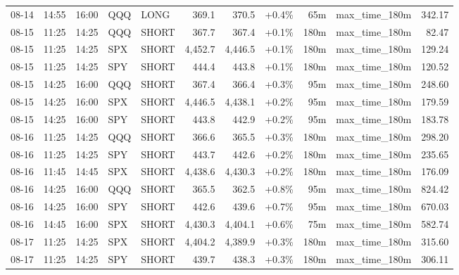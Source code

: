 \documentclass[11pt,a4paper,twoside]{article}
\begin{document}
\begin{center}
\begin{longtable}{>{\color{txtmain}}l l l l l r r r r >{\color{txtmain}}l r}
08-14 & 14:55 & 16:00 & QQQ & LONG & 369.1 & 370.5 & \textcolor{wingreen}{+0.4\%} & 65m & max\_time\_180m & \textcolor{wingreen}{342.17} \\
08-15 & 11:25 & 14:25 & QQQ & SHORT & 367.7 & 367.4 & \textcolor{wingreen}{+0.1\%} & 180m & max\_time\_180m & \textcolor{wingreen}{82.47} \\
08-15 & 11:25 & 14:25 & SPX & SHORT & 4,452.7 & 4,446.5 & \textcolor{wingreen}{+0.1\%} & 180m & max\_time\_180m & \textcolor{wingreen}{129.24} \\
08-15 & 11:25 & 14:25 & SPY & SHORT & 444.4 & 443.8 & \textcolor{wingreen}{+0.1\%} & 180m & max\_time\_180m & \textcolor{wingreen}{120.52} \\
08-15 & 14:25 & 16:00 & QQQ & SHORT & 367.4 & 366.4 & \textcolor{wingreen}{+0.3\%} & 95m & max\_time\_180m & \textcolor{wingreen}{248.60} \\
08-15 & 14:25 & 16:00 & SPX & SHORT & 4,446.5 & 4,438.1 & \textcolor{wingreen}{+0.2\%} & 95m & max\_time\_180m & \textcolor{wingreen}{179.59} \\
08-15 & 14:25 & 16:00 & SPY & SHORT & 443.8 & 442.9 & \textcolor{wingreen}{+0.2\%} & 95m & max\_time\_180m & \textcolor{wingreen}{183.78} \\
08-16 & 11:25 & 14:25 & QQQ & SHORT & 366.6 & 365.5 & \textcolor{wingreen}{+0.3\%} & 180m & max\_time\_180m & \textcolor{wingreen}{298.20} \\
08-16 & 11:25 & 14:25 & SPY & SHORT & 443.7 & 442.6 & \textcolor{wingreen}{+0.2\%} & 180m & max\_time\_180m & \textcolor{wingreen}{235.65} \\
08-16 & 11:45 & 14:45 & SPX & SHORT & 4,438.6 & 4,430.3 & \textcolor{wingreen}{+0.2\%} & 180m & max\_time\_180m & \textcolor{wingreen}{176.09} \\
08-16 & 14:25 & 16:00 & QQQ & SHORT & 365.5 & 362.5 & \textcolor{wingreen}{+0.8\%} & 95m & max\_time\_180m & \textcolor{wingreen}{824.42} \\
08-16 & 14:25 & 16:00 & SPY & SHORT & 442.6 & 439.6 & \textcolor{wingreen}{+0.7\%} & 95m & max\_time\_180m & \textcolor{wingreen}{670.03} \\
08-16 & 14:45 & 16:00 & SPX & SHORT & 4,430.3 & 4,404.1 & \textcolor{wingreen}{+0.6\%} & 75m & max\_time\_180m & \textcolor{wingreen}{582.74} \\
08-17 & 11:25 & 14:25 & SPX & SHORT & 4,404.2 & 4,389.9 & \textcolor{wingreen}{+0.3\%} & 180m & max\_time\_180m & \textcolor{wingreen}{315.60} \\
08-17 & 11:25 & 14:25 & SPY & SHORT & 439.7 & 438.3 & \textcolor{wingreen}{+0.3\%} & 180m & max\_time\_180m & \textcolor{wingreen}{306.11} \\

\end{longtable}
\end{center}
\end{document}

